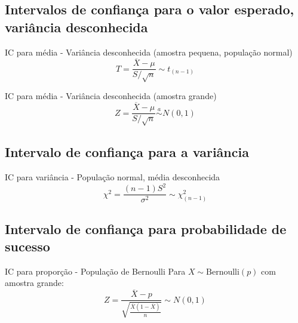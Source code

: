 \documentclass[a4paper,12pt]{article}
\begin{document}
\subsection{Intervalos de confiança para o valor esperado, variância desconhecida}

\begin{formulabox}{{IC para média - Variância desconhecida (amostra pequena, população normal)}}
\begin{equation}\label{formula25}\tag{Fórmula 25}
    T = \frac{\overline{X} - \mu}{S/\sqrt{n}} \sim t_{(n-1)}
\end{equation}
\end{formulabox}

\begin{formulabox}{IC para média - Variância desconhecida (amostra grande)}
\begin{equation}\label{formula26}\tag{Fórmula 26}
    Z = \frac{\overline{X} - \mu}{S/\sqrt{n}} \overset{a}{\sim} N(0,1)
\end{equation}
\end{formulabox}

\subsection{Intervalo de confiança para a variância}

\begin{formulabox}{{IC para variância - População normal, média desconhecida}}
\begin{equation}\label{formula27}\tag{Fórmula 27}
    \chi^2 = \frac{(n-1)S^2}{\sigma^2} \sim \chi^2_{(n-1)}
\end{equation}
\end{formulabox}

\subsection{Intervalo de confiança para probabilidade de sucesso}

\begin{formulabox}{IC para proporção - População de Bernoulli}
Para $X \sim \text{Bernoulli}(p)$ com amostra grande:
\begin{equation}\label{formula28}\tag{Fórmula 28}
    Z = \frac{\overline{X} - p}{\sqrt{\frac{\overline{X}(1-\overline{X})}{n}}} \sim N(0, 1)
\end{equation}
\end{formulabox}

\newpage
\end{document}
